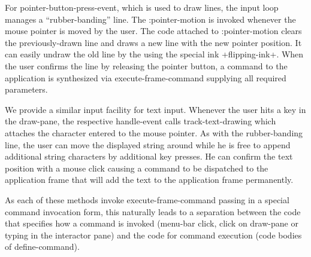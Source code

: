 \documentclass[twocolumn,a4paper]{article}
\newcommand {\code}[1]{{\sffamily #1}}
\let\class\code
\let\method\code
\let\constant\code
\let\keyword\code
\begin{document}
For \class{pointer-button-press-event}, which is used to draw lines, 
the input loop manages a
``rubber-banding'' line. %
The \keyword{:pointer-motion} is invoked
whenever the mouse pointer is moved by the user. The code attached to
\keyword{:pointer-motion} clears the previously-drawn line and draws a new
line with the new pointer position. It can easily undraw the old line
by the using the special ink \constant{+flipping-ink+}. When the user
confirms the line by releasing the pointer button, a command to the
application is synthesized via \method{execute-frame-command}
supplying all required parameters.

We provide a similar  input facility for text input. Whenever
the user hits a key in the draw-pane, the respective
\method{handle-event} calls \method{track-text-drawing} which attaches
the character entered to the mouse pointer.  As with the
rubber-banding line, the user can move the displayed string around while
he is free to append additional string characters by additional key
presses. He can confirm the text position with a mouse click causing a
command to be dispatched to the application frame that will add the text to
the application frame permanently.

As each of these methods invoke \code{execute-frame-command} passing
in a special command invocation form, this naturally leads to a
separation between the code that specifies how a command is invoked (menu-bar click, click on
draw-pane or typing in the interactor pane) and the code for command
execution (code bodies of \method{define-command}).
\end{document}
